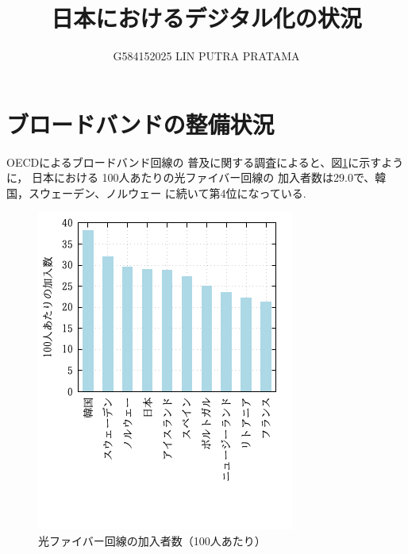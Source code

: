 \documentclass[a4paper,11pt,dvipdfmx]{ujarticle}
\title{日本におけるデジタル化の状況}
\author{G584152025 LIN PUTRA PRATAMA}
\begin{document}
\maketitle %

\section{ブロードバンドの整備状況}

OECDによるブロードバンド回線の
普及に関する調査\cite{oecd}によると、図\ref{fiber}に示すように，
日本における 100人あたりの光ファイバー回線の
加入者数は29.0で、韓国，スウェーデン、ノルウェー
に続いて第4位になっている.

\begin{figure}[htbp]
    \centering
    \includegraphics{Latexpng.png}
    \caption{光ファイバー回線の加入者数（100人あたり）}
    \label{fiber}
\end{figure}
\end{document}
